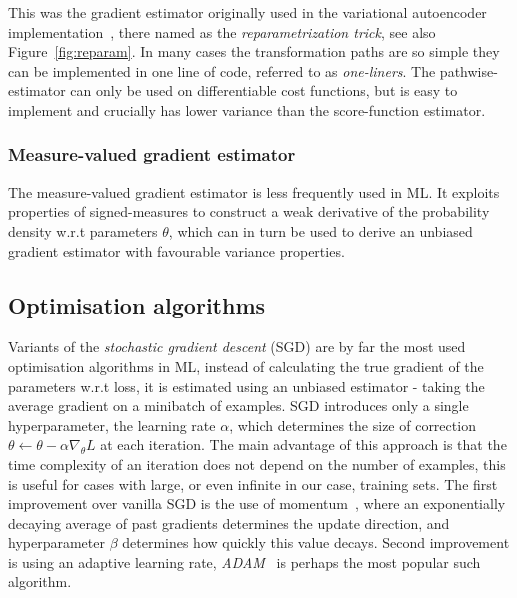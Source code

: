This was the gradient estimator originally used in the variational autoencoder implementation~\cite{kingma2013auto}, there named as the \emph{reparametrization trick}, see also Figure~\ref{fig:reparam}. In many cases the transformation paths are so simple they can be implemented in one line of code, referred to as \emph{one-liners}. The pathwise-estimator can only be used on differentiable cost functions, but is easy to implement and crucially has lower variance than the score-function estimator. 

\subsubsection{Measure-valued gradient estimator}
The measure-valued gradient estimator is less frequently used in ML. It exploits properties of signed-measures to construct a weak derivative of the probability density w.r.t parameters $\theta$, which can in turn be used to derive an unbiased gradient estimator with favourable variance properties. 

\subsection{Optimisation algorithms}
Variants of the \emph{stochastic gradient descent} (SGD) are by far the most used optimisation algorithms in ML, instead of calculating the true gradient of the parameters w.r.t loss, it is estimated using an unbiased estimator - taking the average gradient on a minibatch of examples. SGD introduces only a single hyperparameter, the learning rate $\alpha$, which determines the size of correction $\theta \leftarrow \theta - \alpha \nabla_\theta L$ at each iteration. The main advantage of this approach is that the time complexity of an iteration does not depend on the number of examples, this is useful for cases with large, or even infinite in our case, training sets. The first improvement over vanilla SGD is the use of momentum~\cite{polyak1964some}, where an exponentially decaying average of past gradients determines the update direction, and hyperparameter $\beta$ determines how quickly this value decays. Second improvement is using an adaptive learning rate, \emph{ADAM}~\cite{kingma2014adam} is perhaps the most popular such algorithm. 

